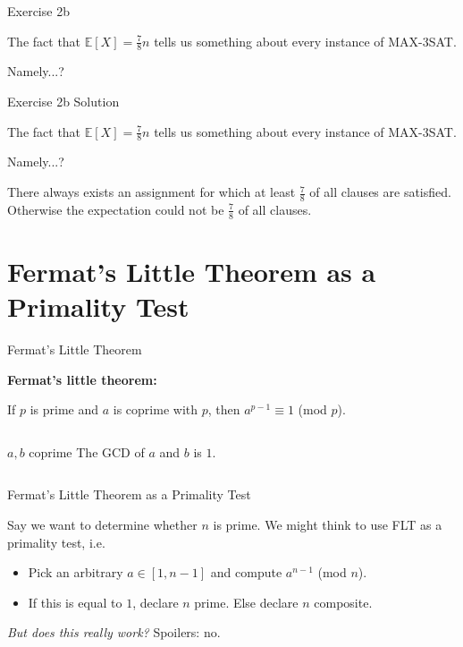 \documentclass[10pt]{beamer}
\begin{document}
\begin{frame}[fragile]{Exercise 2b}

The fact that $\mathbb{E}[X] = \frac{7}{8}n$ tells us something about every instance of MAX-3SAT.

Namely...?

\end{frame}

\begin{frame}[fragile]{Exercise 2b {\color{red} Solution}}

The fact that $\mathbb{E}[X] = \frac{7}{8}n$ tells us something about every instance of MAX-3SAT.

Namely...?

{\color{red} There always exists an assignment for which at least $\frac{7}{8}$ of all clauses are satisfied. Otherwise the expectation could not be $\frac{7}{8}$ of all clauses.}

\end{frame}

\section{Fermat's Little Theorem as a Primality Test}

\begin{frame}{Fermat's Little Theorem}

\textbf{Fermat's little theorem:}

If $p$ is prime and $a$ is coprime with $p$, then $a^{p - 1} \equiv 1$ (mod $p$).

\begin{columns}[T, onlytextwidth]
  \begin{block}{$a, b$ coprime}
    The GCD of $a$ and $b$ is $1$.
  \end{block}
\end{columns}

\end{frame}

\begin{frame}{Fermat's Little Theorem as a Primality Test}

Say we want to determine whether $n$ is prime. We might think to use FLT as a primality test, i.e.
\begin{itemize}
\item Pick an arbitrary $a \in [1, n - 1]$ and compute $a^{n - 1}$ (mod $n$).
\item If this is equal to $1$, declare $n$ prime. Else declare $n$ composite.
\end{itemize}

\textit{But does this really work?} Spoilers: no.

\end{frame}
\end{document}
